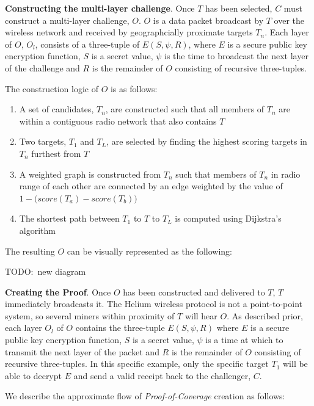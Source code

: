 \documentclass[letterpaper,11pt]{article}
\newcommand{\todo}[1]{}
\renewcommand{\todo}[1]{{\color{red} TODO:\ {#1}}}
\begin{document}
\textbf{Constructing the multi-layer challenge}. Once $T$ has been selected, $C$ must construct a multi-layer challenge, $O$. $O$ is a data packet broadcast by $T$ over the wireless network and received by geographcially proximate targets $T_n$. Each layer of $O$, $O_l$, consists of a three-tuple of $E\left(S, \psi, R\right)$, where $E$ is a secure public key encryption function, $S$ is a secret value, $\psi$ is the time to broadcast the next layer of the challenge and $R$ is the remainder of $O$ consisting of recursive three-tuples.

The construction logic of $O$ is as follows:

\begin{enumerate}
  \item A set of candidates, $T_n$, are constructed such that all members of $T_n$ are within a contiguous radio network that also contains $T$
  \item Two targets, $T_1$ and $T_L$, are selected by finding the highest scoring targets in $T_n$ furthest from $T$
  \item A weighted graph is constructed from $T_n$ such that members of $T_n$ in radio range of each other are connected by an edge weighted by the value of \(1 - \Big({score(T_a) - score(T_b)}\Big)\)
  \item The shortest path between $T_1$ to $T$ to $T_L$ is computed using Dijkstra's algorithm\cite{dijkstra}
\end{enumerate}

The resulting $O$ can be visually represented as the following:

\todo{new diagram}

\textbf{Creating the Proof}. Once $O$ has been constructed and delivered to $T$, $T$ immediately broadcasts it. The Helium wireless protocol is not a point-to-point system, so several miners within proximity of $T$ will hear $O$. As described prior, each layer $O_l$ of $O$ contains the three-tuple ${E\left(S, \psi, R\right)}$ where $E$ is a secure public key encryption function, $S$ is a secret value, $\psi$ is a time at which to transmit the next layer of the packet and $R$ is the remainder of $O$ consisting of recursive three-tuples. In this specific example, only the specific target $T_1$ will be able to decrypt $E$ and send a valid receipt back to the challenger, $C$.

We describe the approximate flow of \emph{Proof-of-Coverage} creation as follows:
\end{document}
